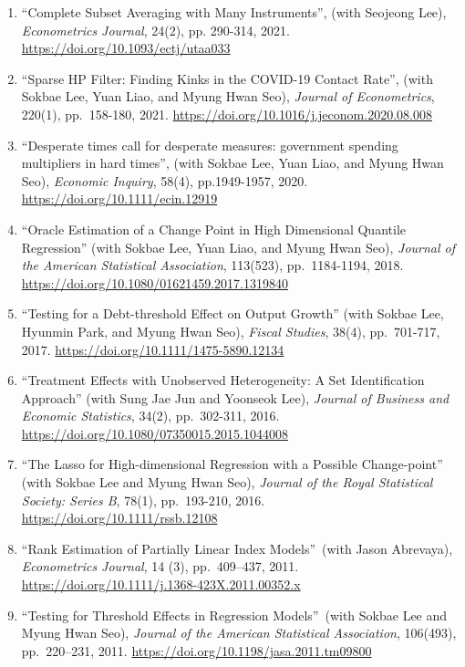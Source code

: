\documentclass[12pt]{article}
\begin{document}
\begin{enumerate}
\item ``Complete Subset Averaging with Many Instruments'',  (with Seojeong Lee), \textit{Econometrics Journal}, 24(2), pp. 290-314, 2021. \url{https://doi.org/10.1093/ectj/utaa033}

\item ``Sparse HP Filter: Finding Kinks in the COVID-19 Contact Rate'',  (with Sokbae Lee, Yuan Liao, and Myung Hwan Seo), \textit{Journal of Econometrics}, 220(1), pp.\ 158-180, 2021. \url{https://doi.org/10.1016/j.jeconom.2020.08.008}

\item ``Desperate times call for desperate measures: government spending multipliers in hard times'', (with Sokbae Lee, Yuan Liao, and Myung Hwan Seo), \textit{Economic Inquiry}, 58(4), pp.1949-1957, 2020. \url{https://doi.org/10.1111/ecin.12919}

\item ``Oracle Estimation of a Change Point in High Dimensional Quantile Regression'' (with Sokbae Lee, Yuan Liao, and Myung Hwan Seo), \textit{Journal of the American Statistical Association}, 113(523), pp.\ 1184-1194, 2018. \url{https://doi.org/10.1080/01621459.2017.1319840}

\item ``Testing for a Debt-threshold Effect on Output Growth'' (with Sokbae Lee, Hyunmin Park, and Myung Hwan Seo), \textit{Fiscal Studies}, 38(4), pp.\ 701-717, 2017. \url{https://doi.org/10.1111/1475-5890.12134}

\item ``Treatment Effects with Unobserved Heterogeneity: A Set Identification Approach'' (with Sung Jae Jun and Yoonseok Lee), \textit{Journal of Business and Economic Statistics}, 34(2), pp.\ 302-311, 2016. \url{https://doi.org/10.1080/07350015.2015.1044008}

\item ``The Lasso for High-dimensional Regression with a Possible Change-point'' (with Sokbae Lee and Myung Hwan Seo),  \textit{Journal of the Royal Statistical Society: Series B}, 78(1), pp.\ 193-210, 2016. \url{https://doi.org/10.1111/rssb.12108}

\item \textquotedblleft Rank Estimation of Partially Linear
Index Models\textquotedblright\ (with Jason Abrevaya), \textit{Econometrics Journal}, 14 (3), pp.\ 409--437, 2011. \url{https://doi.org/10.1111/j.1368-423X.2011.00352.x}

\item \textquotedblleft Testing for Threshold Effects in
Regression Models\textquotedblright\ (with Sokbae Lee and Myung Hwan Seo),
\textit{Journal of the American Statistical Association},
106(493), pp.\ 220--231, 2011. \url{https://doi.org/10.1198/jasa.2011.tm09800}


\end{enumerate}
\end{document}
